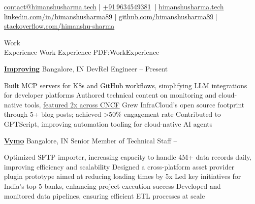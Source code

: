 \documentclass[letterpaper,MMMyyyy,nonstopmode]{simpleresumecv}
\newcommand{\CVAuthor}{Himanshu Sharma}
\newcommand{\CVWebpage}{https://himanshusharma.tech}
\begin{document}

\Title{\CVAuthor}
\Gap
\begin{SubTitle}
\href{mailto:contact@himanshusharma.tech}
{contact@himanshusharma.tech}
|
\href{tel:+919634549381}{+91\,9634549381}\
|
\href{\CVWebpage}{\url{himanshusharma.tech}}
\Gap
\href{https://linkedin.com/in/himanshusharma89}{\url{linkedin.com/in/himanshusharma89}}
|
\href{https://github.com/himanshusharma89}{\url{github.com/himanshusharma89}}
|
\href{https://stackoverflow.com/users/11545939/himanshu-sharma}{\url{stackoverflow.com/himanshu-sharma}}
\end{SubTitle}

\begin{Body}


\Section
{Work\\Experience}
{Work Experience}
{PDF:WorkExperience}

\Entry
\href{https://infracloud.io/}
{\textbf{Improving}}
\hfill Bangalore, IN
\Gap
DevRel Engineer
\hfill
{} -- Present
\begin{Detail}
\Gap
\BulletItem Built MCP servers for K8s and GitHub workflows, simplifying LLM integrations for developer platforms
\Gap
\BulletItem
Authored technical content on monitoring and cloud-native tools, \underline{\href{https://www.cncf.io/kubeweekly/kubeweekly-428/\#technical}{featured 2x across CNCF}}
\Gap
\BulletItem
Grew InfraCloud’s open source footprint through 5+ blog posts; achieved >50$\%$ engagement rate
\Gap
\BulletItem
Contributed to GPTScript, improving automation tooling for cloud-native AI agents%
\end{Detail}

\BigGap

\Entry
\href{https://vymo.com}
{\textbf{Vymo}}
\hfill Bangalore, IN
\Gap
Senior Member of Technical Staff
\hfill
{} -- 
\begin{Detail}
\Gap
\BulletItem
Optimized SFTP importer, increasing capacity to handle 4M+ data records daily, improving efficiency and scalability
\Gap
\BulletItem
Designed a cross-platform asset provider plugin prototype aimed at reducing loading times by 5x
\Gap
\BulletItem
Led key initiatives for India’s top 5 banks, enhancing project execution success
\Gap
\BulletItem
Developed and monitored data pipelines, ensuring efficient ETL processes at scale
\end{Detail}


\end{Body}
\end{document}

